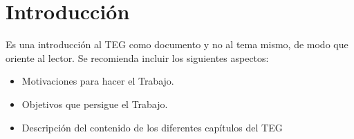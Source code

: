 \chapter{Introducci\'on}

Es una introducci\'on al TEG como documento y no al tema mismo, de modo que oriente al lector. Se recomienda incluir los siguientes aspectos:
\begin{itemize}
	\item Motivaciones para hacer el Trabajo.
	\item Objetivos que persigue el Trabajo.	
	\item Descripci\'on del contenido de los diferentes cap\'itulos del TEG
\end{itemize}